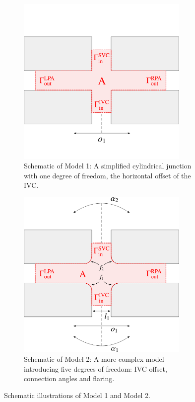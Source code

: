 \begin{figure}[H]
	\begin{subfigure}{0.48\textwidth}
		\centering
		\includegraphics[width=0.91\textwidth, trim={0 0 0 0}]{figures/model1.pdf}
		\caption[Simplified Cylindrical Junction]{Schematic of Model 1: A simplified cylindrical junction with one degree of freedom, the horizontal offset of the IVC.}
		\label{fig:model1_schematic}
	\end{subfigure}\hfill%
	\begin{subfigure}{0.48\textwidth}
		\centering
		\includegraphics[width=0.91\textwidth]{figures/model2.pdf}
		\caption[Complex Geometric Model]{Schematic of Model 2: A more complex model introducing five degrees of freedom: IVC offset, connection angles and flaring.}
		\label{fig:model2_schematic}
	\end{subfigure}
	\vspace{4mm}
	\caption{Schematic illustrations of Model 1 and Model 2.}
	\label{fig:model schemas}
\end{figure}